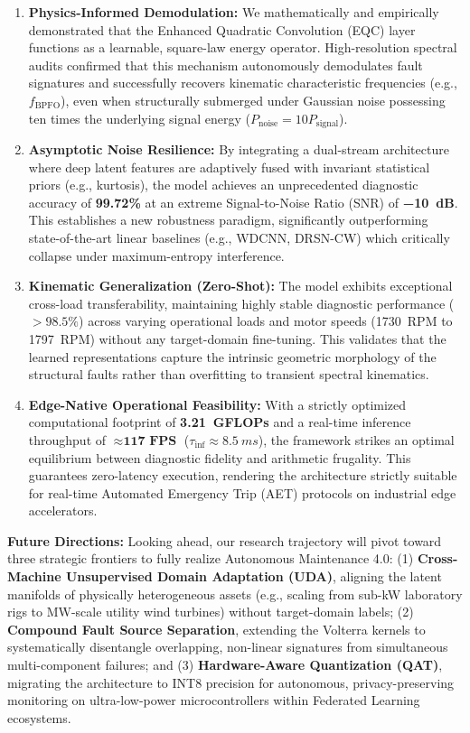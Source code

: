 \documentclass[5p,times,twocolumn]{elsarticle}
\begin{document}
\begin{enumerate}
    \item \textbf{Physics-Informed Demodulation:} We mathematically and empirically demonstrated that the Enhanced Quadratic Convolution (EQC) layer functions as a learnable, square-law energy operator. High-resolution spectral audits confirmed that this mechanism autonomously demodulates fault signatures and successfully recovers kinematic characteristic frequencies (e.g., $f_{\text{BPFO}}$), even when structurally submerged under Gaussian noise possessing ten times the underlying signal energy ($P_{\text{noise}} = 10 P_{\text{signal}}$).
    
    \item \textbf{Asymptotic Noise Resilience:} By integrating a dual-stream architecture where deep latent features are adaptively fused with invariant statistical priors (e.g., kurtosis), the model achieves an unprecedented diagnostic accuracy of \textbf{99.72\%} at an extreme Signal-to-Noise Ratio (SNR) of \textbf{\SI{-10}{dB}}. This establishes a new robustness paradigm, significantly outperforming state-of-the-art linear baselines (e.g., WDCNN, DRSN-CW) which critically collapse under maximum-entropy interference.
    
    \item \textbf{Kinematic Generalization (Zero-Shot):} The model exhibits exceptional cross-load transferability, maintaining highly stable diagnostic performance ($>98.5\%$) across varying operational loads and motor speeds (\SI{1730}{RPM} to \SI{1797}{RPM}) without any target-domain fine-tuning. This validates that the learned representations capture the intrinsic geometric morphology of the structural faults rather than overfitting to transient spectral kinematics.
    
    \item \textbf{Edge-Native Operational Feasibility:} With a strictly optimized computational footprint of \textbf{\SI{3.21}{GFLOPs}} and a real-time inference throughput of $\approx \textbf{117 FPS}$ ($\tau_{\text{inf}} \approx \SI{8.5}{ms}$), the framework strikes an optimal equilibrium between diagnostic fidelity and arithmetic frugality. This guarantees zero-latency execution, rendering the architecture strictly suitable for real-time Automated Emergency Trip (AET) protocols on industrial edge accelerators.
\end{enumerate}



\textbf{Future Directions:} Looking ahead, our research trajectory will pivot toward three strategic frontiers to fully realize Autonomous Maintenance 4.0: (1) \textbf{Cross-Machine Unsupervised Domain Adaptation (UDA)}, aligning the latent manifolds of physically heterogeneous assets (e.g., scaling from sub-kW laboratory rigs to MW-scale utility wind turbines) without target-domain labels; (2) \textbf{Compound Fault Source Separation}, extending the Volterra kernels to systematically disentangle overlapping, non-linear signatures from simultaneous multi-component failures; and (3) \textbf{Hardware-Aware Quantization (QAT)}, migrating the architecture to INT8 precision for autonomous, privacy-preserving monitoring on ultra-low-power microcontrollers within Federated Learning ecosystems.



\end{document}
